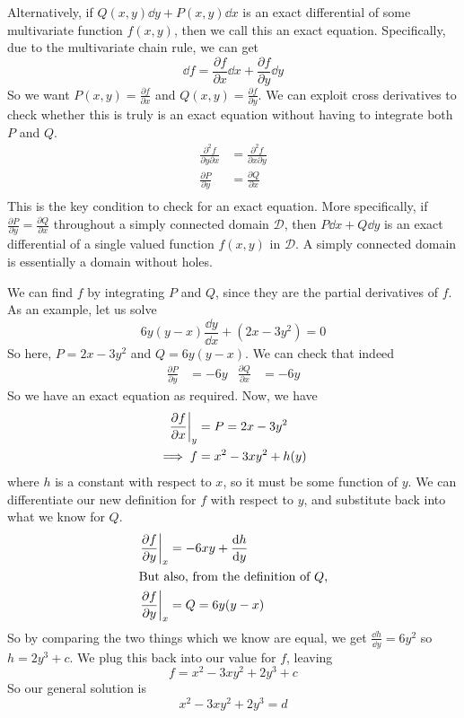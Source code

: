 \documentclass{article}
\begin{document}
Alternatively, if $Q(x, y)\dd y + P(x, y)\dd x$ is an exact differential of some multivariate function $f(x, y)$, then we call this an exact equation. Specifically, due to the multivariate chain rule, we can get
\[ \dd f = \frac{\partial f}{\partial x} \dd x + \frac{\partial f}{\partial y} \dd y \]
So we want $P(x, y) = \frac{\partial f}{\partial x}$ and $Q(x, y) = \frac{\partial f}{\partial y}$. We can exploit cross derivatives to check whether this is truly is an exact equation without having to integrate both $P$ and $Q$.
\begin{align*}
	\frac{\partial^2 f}{\partial y \partial x} & = \frac{\partial^2 f}{\partial x \partial y} \\
	\frac{\partial P}{\partial y}              & = \frac{\partial Q}{\partial x}              \\
\end{align*}
This is the key condition to check for an exact equation. More specifically, if $\frac{\partial P}{\partial y} = \frac{\partial Q}{\partial x}$ throughout a simply connected domain $\mathcal D$, then $P \dd x + Q \dd y$ is an exact differential of a single valued function $f(x, y)$ in $\mathcal D$. A simply connected domain is essentially a domain without holes.

We can find $f$ by integrating $P$ and $Q$, since they are the partial derivatives of $f$. As an example, let us solve
\[ 6y(y-x)\frac{\dd y}{\dd x} + (2x - 3y^2) = 0 \]
So here, $P = 2x - 3y^2$ and $Q = 6y(y-x)$. We can check that indeed
\begin{align*}
	\frac{\partial P}{\partial y} & = -6y & \frac{\partial Q}{\partial x} & = -6y
\end{align*}
So we have an exact equation as required. Now, we have
\begin{align*}
	\eval{\frac{\partial f}{\partial x}}_y & = P = 2x - 3y^2      \\
	\implies f                             & = x^2 - 3xy^2 + h(y)
\end{align*}
where $h$ is a constant with respect to $x$, so it must be some function of $y$. We can differentiate our new definition for $f$ with respect to $y$, and substitute back into what we know for $Q$.
\begin{align*}
	\eval{\frac{\partial f}{\partial y}}_x & = -6xy + \frac{\dd h}{\dd y} \\
	\intertext{But also, from the definition of $Q$,}
	\eval{\frac{\partial f}{\partial y}}_x & = Q = 6y(y-x)                \\
\end{align*}
So by comparing the two things which we know are equal, we get $\frac{\dd h}{\dd y} = 6y^2$ so $h = 2y^3 + c$. We plug this back into our value for $f$, leaving
\[ f = x^2 - 3xy^2 + 2y^3 + c \]
So our general solution is
\[ x^2 - 3xy^2 + 2y^3 = d \]
\end{document}
